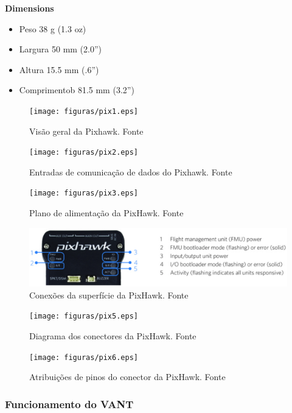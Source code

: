 \textbf{Dimensions}
\begin{itemize}
\item Peso 38 g (1.3 oz)
\item Largura 50 mm (2.0”)
\item Altura 15.5 mm (.6”)
\item Comprimentob 81.5 mm (3.2”)
\end{itemize}

\begin{figure}[H]
	\centering
	  \texttt{[image: figuras/pix1.eps]}
	\caption{Visão geral da Pixhawk. Fonte \cite{pixhawk}}
	\label{fig:pix1}
\end{figure}

\begin{figure}[H]
	\centering
	  \texttt{[image: figuras/pix2.eps]}
	\caption{Entradas  de comunicação de dados  do Pixhawk. Fonte \cite{pixhawk}}
	\label{fig:pix2}
\end{figure}

\begin{figure}[H]
	\centering
	  \texttt{[image: figuras/pix3.eps]}
	\caption{Plano de alimentação da PixHawk. Fonte \cite{pixhawk}}
	\label{fig:pix3}
\end{figure}

\begin{figure}[H]
	\centering
	  \includegraphics[keepaspectratio=true,scale=0.6]{figuras/pix4.eps}
	\caption{Conexões da superfície da PixHawk. Fonte \cite{pixhawk}}
	\label{fig:pix4}
\end{figure}

\begin{figure}[H]
	\centering
	  \texttt{[image: figuras/pix5.eps]}
	\caption{Diagrama dos conectores da PixHawk. Fonte \cite{pixhawk}}
	\label{fig:pix5}
\end{figure}

\begin{figure}[H]
	\centering
	  \texttt{[image: figuras/pix6.eps]}
	\caption{Atribuições de pinos do conector da PixHawk. Fonte \cite{pixhawk}}
	\label{fig:pix6}
\end{figure}


\subsubsection{Funcionamento do VANT}

